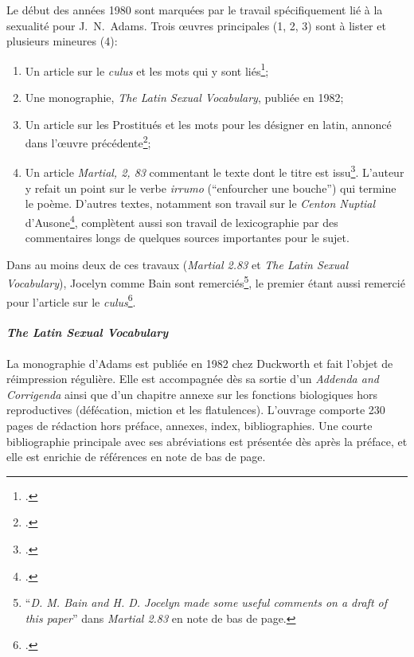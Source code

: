 Le début des années 1980 sont marquées par le travail spécifiquement lié à la sexualité pour J.~N.~Adams. Trois œuvres principales (1, 2, 3) sont à lister et plusieurs mineures (4):
\begin{enumerate}
    \item Un article sur le \textit{culus} et les mots qui y sont liés\footcite{adams_culus_1981};
    \item Une monographie, \textit{The Latin Sexual Vocabulary}, publiée en 1982;
    \item Un article sur les Prostitués et les mots pour les désigner en latin, annoncé dans l'œuvre précédente\footcite{adams_prostitute};
    \item Un article \textit{Martial, 2, 83} commentant le texte dont le titre est issu\footcite{adams_martial_1983}. L'auteur y refait un point sur le verbe \textit{irrumo} (\enquote{enfourcher une bouche}) qui termine le poème. D'autres textes, notamment son travail sur le \textit{Centon Nuptial} d'Ausone\footcite{adams1981ausonius}, complètent aussi son travail de lexicographie par des commentaires longs de quelques sources importantes pour le sujet.
\end{enumerate}
Dans au moins deux de ces travaux (\textit{Martial 2.83} et \textit{The Latin Sexual Vocabulary}), Jocelyn comme Bain sont remerciés\footnote{\enquote{\textit{D. M. Bain and H. D. Jocelyn made some useful comments on a draft of this paper}} dans \textit{Martial 2.83} en note de bas de page.}, le premier étant aussi remercié pour l'article sur le \textit{culus}\footcite[p.~264]{adams_culus_1981}. 

\paragraph{\textit{The Latin Sexual Vocabulary}}

La monographie d'Adams est publiée en 1982 chez Duckworth et fait l'objet de réimpression régulière. Elle est accompagnée dès sa sortie d'un \textit{Addenda and Corrigenda} ainsi que d'un chapitre annexe sur les fonctions biologiques hors reproductives (défécation, miction et les flatulences). L'ouvrage comporte 230 pages de rédaction hors préface, annexes, index, bibliographies. Une courte bibliographie principale avec ses abréviations est présentée dès après la préface, et elle est enrichie de références en note de bas de page.

